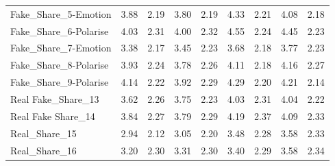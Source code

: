\documentclass[empirical, authordate]{jote-new-article}
\begin{document}
\begin{table}
\begin{tabularx}{\linewidth}{@{} X  S S S S | S S S S@{}}
    Fake\_Share\_5-Emotion   & 3.88                                           & 2.19                                         & 3.80           & 2.19            & 4.33          & 2.21           & 4.08           & 2.18            \\
    Fake\_Share\_6-Polarise  & 4.03                                           & 2.31                                         & 4.00           & 2.32            & 4.55          & 2.24           & 4.45           & 2.23            \\
    Fake\_Share\_7-Emotion   & 3.38                                           & 2.17                                         & 3.45           & 2.23            & 3.68          & 2.18           & 3.77           & 2.23            \\
    Fake\_Share\_8-Polarise  & 3.93                                           & 2.24                                         & 3.78           & 2.26            & 4.11          & 2.18           & 4.16           & 2.27            \\
    Fake\_Share\_9-Polarise  & 4.14                                           & 2.22                                         & 3.92           & 2.29            & 4.29          & 2.20           & 4.21           & 2.14            \\
    Real Fake\_Share\_13     & 3.62                                           & 2.26                                         & 3.75           & 2.23            & 4.03          & 2.31           & 4.04           & 2.22            \\
    Real Fake Share\_14      & 3.84                                           & 2.27                                         & 3.79           & 2.29            & 4.19          & 2.37           & 4.09           & 2.33            \\
    Real\_Share\_15          & 2.94                                           & 2.12                                         & 3.05           & 2.20            & 3.48          & 2.28           & 3.58           & 2.33            \\
    Real\_Share\_16          & 3.20                                           & 2.30                                         & 3.31           & 2.30            & 3.40          & 2.29           & 3.58           & 2.34            \\
    \bottomrule
  \end{tabularx}


\end{table}
\end{document}
